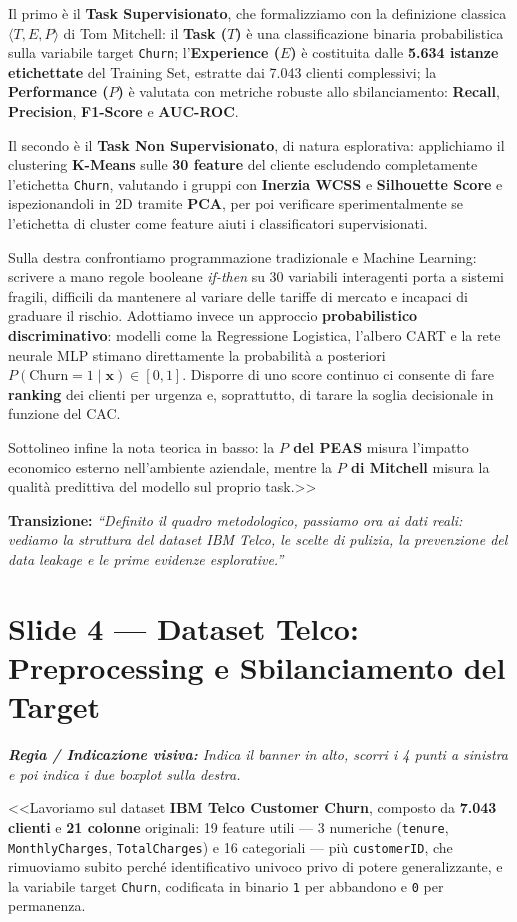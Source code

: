 \documentclass[10pt, a4paper]{article}
\newcommand{\cue}[1]{%
  \par\vspace{2pt}\noindent\colorbox{CueBg}{\parbox{\dimexpr\linewidth-2\fboxsep}{\footnotesize\textit{\color{PrimaryNavy}\textbf{Regia / Indicazione visiva:} #1}}}\par\vspace{3pt}%
}
\newcommand{\transition}[1]{%
  \par\vspace{2pt}\noindent\colorbox{LightBg}{\parbox{\dimexpr\linewidth-2\fboxsep}{\small\textbf{\color{SecondaryBlue}Transizione:} \textit{``#1''}}}\par\vspace{4pt}%
}
\begin{document}
Il primo è il \textbf{Task Supervisionato}, che formalizziamo con la definizione classica $\langle T, E, P \rangle$ di Tom Mitchell: il \textbf{Task ($T$)} è una classificazione binaria probabilistica sulla variabile target \texttt{Churn}; l'\textbf{Experience ($E$)} è costituita dalle \textbf{5.634 istanze etichettate} del Training Set, estratte dai 7.043 clienti complessivi; la \textbf{Performance ($P$)} è valutata con metriche robuste allo sbilanciamento: \textbf{Recall}, \textbf{Precision}, \textbf{F1-Score} e \textbf{AUC-ROC}.

Il secondo è il \textbf{Task Non Supervisionato}, di natura esplorativa: applichiamo il clustering \textbf{K-Means} sulle \textbf{30 feature} del cliente escludendo completamente l'etichetta \texttt{Churn}, valutando i gruppi con \textbf{Inerzia WCSS} e \textbf{Silhouette Score} e ispezionandoli in 2D tramite \textbf{PCA}, per poi verificare sperimentalmente se l'etichetta di cluster come feature aiuti i classificatori supervisionati.

Sulla destra confrontiamo programmazione tradizionale e Machine Learning: scrivere a mano regole booleane \textit{if-then} su 30 variabili interagenti porta a sistemi fragili, difficili da mantenere al variare delle tariffe di mercato e incapaci di graduare il rischio. Adottiamo invece un approccio \textbf{probabilistico discriminativo}: modelli come la Regressione Logistica, l'albero CART e la rete neurale MLP stimano direttamente la probabilità a posteriori $P(\text{Churn}=1 \mid \mathbf{x}) \in [0, 1]$. Disporre di uno score continuo ci consente di fare \textbf{ranking} dei clienti per urgenza e, soprattutto, di tarare la soglia decisionale in funzione del CAC.

Sottolineo infine la nota teorica in basso: la \textbf{$P$ del PEAS} misura l'impatto economico esterno nell'ambiente aziendale, mentre la \textbf{$P$ di Mitchell} misura la qualità predittiva del modello sul proprio task.>>
\transition{Definito il quadro metodologico, passiamo ora ai dati reali: vediamo la struttura del dataset IBM Telco, le scelte di pulizia, la prevenzione del data leakage e le prime evidenze esplorative.}

\section*{Slide 4 --- Dataset Telco: Preprocessing e Sbilanciamento del Target}
\cue{Indica il banner in alto, scorri i 4 punti a sinistra e poi indica i due boxplot sulla destra.}
\noindent <<Lavoriamo sul dataset \textbf{IBM Telco Customer Churn}, composto da \textbf{7.043 clienti} e \textbf{21 colonne} originali: 19 feature utili --- 3 numeriche (\texttt{tenure}, \texttt{MonthlyCharges}, \texttt{TotalCharges}) e 16 categoriali --- più \texttt{customerID}, che rimuoviamo subito perché identificativo univoco privo di potere generalizzante, e la variabile target \texttt{Churn}, codificata in binario \texttt{1} per abbandono e \texttt{0} per permanenza.
\end{document}
